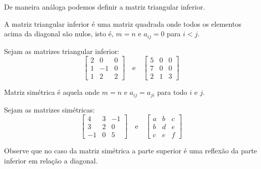 De maneira análoga podemos definir a matriz triangular inferior.
\begin{df}
	A matriz triangular inferior é uma matriz quadrada onde todos os elementos acima da diagonal são nulos, isto é, $m=n$ e $a_{ij}=0$ para $i<j$.
\end{df}
\begin{ex}
	Sejam as matrizes triangular inferior:\\
	\begin{equation*}
	\begin{bmatrix}
	2   & 0 & 0 \\
	1   & -1 & 0 \\
	1   & 2  & 2
	\end{bmatrix}\quad \text{e} \quad
	\begin{bmatrix}
	5  & 0 & 0 \\
	7  & 0 & 0 \\
	2  & 1 & 3
	\end{bmatrix}
	\end{equation*} 
	
\end{ex}
\begin{df}
	Matriz simétrica é aquela onde $m=n$ e $a_{ij}=a_{ji}$ para todo $i$ e $j$.
\end{df}
\begin{ex}
	Sejam as matrizes simétricas:\\
	\begin{equation*}
	\begin{bmatrix}
	4   & 3 & -1 \\
	3   & 2 & 0 \\
	-1  & 0  & 5
	\end{bmatrix}\quad \text{e} \quad
	\begin{bmatrix}
	a  & b & c \\
	b  & d & e \\
	c  & e & f
	\end{bmatrix}
	\end{equation*} 
	
\end{ex}
Observe que no caso da matriz simétrica a parte superior é uma reflexão da parte inferior em relação a diagonal.
